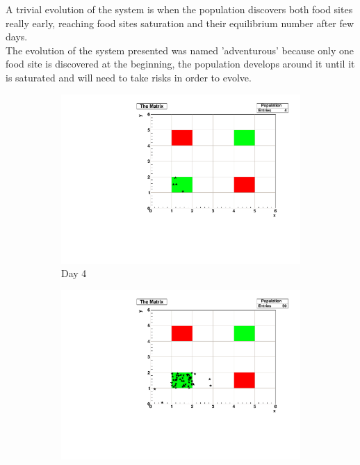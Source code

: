 \documentclass[a4paper,prd,twocolumn,nofootinbib,superscriptaddress,floatfix]{revtex4}
\begin{document}
A trivial evolution of the system is when the population discovers both food sites really early, reaching food sites saturation and their equilibrium number after few days. \\
The evolution of the system presented was named 'adventurous' because only one food site is discovered at the beginning, the population develops around it until it is saturated and will need to take risks in order to evolve. \\
\setcounter{figure}{4}
\begin{figure}[H] 
  \begin{subfigure}[b]{0.5\linewidth}
    \centering
    \includegraphics[width=0.9\linewidth]{a_4.pdf} 
    \caption{Day 4} 
    \label{fig:6a} 
    \vspace{4ex}
  \end{subfigure}%
  \begin{subfigure}[b]{0.5\linewidth}
    \centering
    \includegraphics[width=0.9\linewidth]{a_18.pdf} 

\end{subfigure}
\end{figure}
\end{document}

